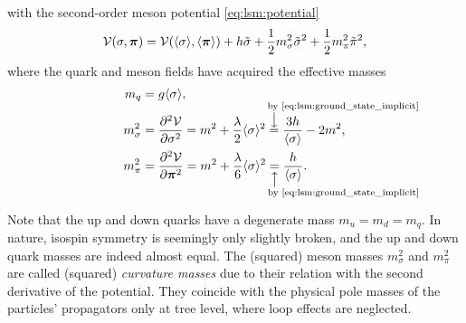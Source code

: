 with the second-order meson potential \eqref{eq:lsm:potential}
\begin{equation}
	\mathcal{V}(\sigma,{\bm{\pi}}) = \mathcal{V}(\langle \sigma \rangle,\langle {\bm{\pi}} \rangle) + h \tilde{\sigma} + \frac12 m_\sigma^2 \tilde{\sigma}^2 + \frac12 m_\pi^2 \tilde{\pi}^2,
\end{equation}
where the quark and meson fields have acquired the effective masses
\begin{subequations}
\begin{align}
	m_q &= g \avg{\sigma}, \label{eq:lsm:mass_quark} \\
	m_\sigma^2 &= \pdv[2]{\pot}{\sigma}\iffalse_{\substack{\sigma=\avg{\sigma}\\\vec{\pi}=\avg{\vec{\pi}}}}\fi    = m^2 + \frac{\lambda}{2} \avg{\sigma}^2 \equalexplabove{\smash[t]{\text{ by \eqref{eq:lsm:ground_state_implicit}}}} \frac{3h}{\avg{\sigma}} - 2 m^2 , \label{eq:lsm:mass_sigma} \\
	m_\pi^2    &= \pdv[2]{\pot}{\vec{\pi}}\iffalse_{\substack{\sigma=\avg{\sigma}\\\vec{\pi}=\avg{\vec{\pi}}}}\fi = m^2 + \frac{\lambda}{6} \avg{\sigma}^2 \equalexplbelow{\smash[b]{\text{ by \eqref{eq:lsm:ground_state_implicit}}}} \frac{h}{\avg{\sigma}} . \label{eq:lsm:mass_pi}
\end{align}%
\label{eq:lsm:mass_sigmapi}%
\end{subequations}%

Note that the up and down quarks have a degenerate mass $m_u = m_d = m_q$.
In nature, isospin symmetry is seemingly only slightly broken, and the up and down quark masses are indeed almost equal.
The (squared) meson masses $m_\sigma^2$ and $m_\pi^2$ are called (squared) \emph{curvature masses}
due to their relation with the second derivative of the potential.
They coincide with the physical pole masses of the particles' propagators
only at tree level, where loop effects are neglected.

